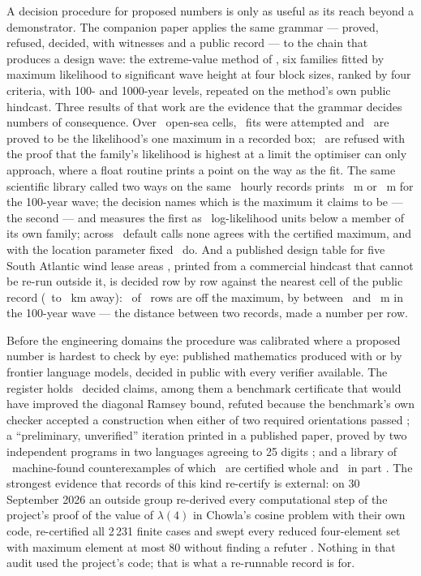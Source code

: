 \documentclass[preprint,11pt,authoryear]{elsarticle}
\begin{document}
A decision procedure for proposed numbers is only as useful as its reach beyond a demonstrator. The companion paper \citep{toledo2026p1} applies the same grammar --- proved, refused, decided, with witnesses and a public record --- to the chain that produces a design wave: the extreme-value method of \citet{reis2026}, six families fitted by maximum likelihood to significant wave height at four block sizes, ranked by four criteria, with 100- and 1000-year levels, repeated on the method's own public hindcast. Three results of that work are the evidence that the grammar decides numbers of consequence. Over \ACells\ open-sea cells, \AFits\ fits were attempted and \ACertified\ are proved to be the likelihood's one maximum in a recorded box; \AGGLimit\ are refused with the proof that the family's likelihood is highest at a limit the optimiser can only approach, where a float routine prints a point on the way as the fit. The same scientific library \citep[SciPy \ScipyVersion;][]{virtanen2020} called two ways on the same \RBuoyN\ hourly records prints \SEwFree\ m or \SEwFixed\ m for the 100-year wave; the decision names which is the maximum it claims to be --- the second --- and measures the first as \SEwDeficit\ log-likelihood units below a member of its own family; across \SFits\ default calls none agrees with the certified maximum, and with the location parameter fixed \SFixedAgree\ do. And a published design table for five South Atlantic wind lease areas \citep{bhaskaran2023}, printed from a commercial hindcast that cannot be re-run outside it, is decided row by row against the nearest cell of the public record (\TKmMin\ to \TKmMax\ km away): \TOff\ of \TRows\ rows are off the maximum, by between \TDMin\ and \TDMax\ m in the 100-year wave --- the distance between two records, made a number per row.

Before the engineering domains the procedure was calibrated where a proposed number is hardest to check by eye: published mathematics produced with or by frontier language models, decided in public with every verifier available. The register holds \KDecided\ decided claims, among them a benchmark certificate that would have improved the diagonal Ramsey bound, refuted because the benchmark's own checker accepted a construction when either of two required orientations passed \citep{horizonmath2026}; a ``preliminary, unverified'' iteration printed in a published paper, proved by two independent programs in two languages agreeing to 25 digits \citep{gnnw2024}; and a library of \KCountex\ machine-found counterexamples of which \KCountexCertified\ are certified whole and \KCountexPartial\ in part \citep{sra2026}. The strongest evidence that records of this kind re-certify is external: on 30 September 2026 an outside group re-derived every computational step of the project's proof of the value of $\lambda(4)$ in Chowla's cosine problem with their own code, re-certified all 2\,231 finite cases and swept every reduced four-element set with maximum element at most 80 without finding a refuter \citep{rainrzk2026}. Nothing in that audit used the project's code; that is what a re-runnable record is for.
\end{document}
